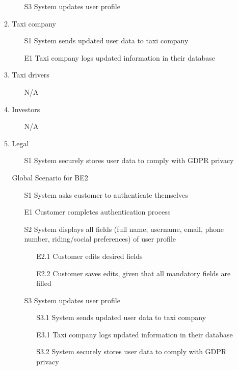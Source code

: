 \documentclass[]{article}
\begin{document}
\begin{enumerate}[{BE}1.]
\begin{enumerate}[{VP2}.1]
\begin{enumerate}
				\item[S3] System updates user profile
			\end{enumerate}
		\item Taxi company
			\begin{enumerate}
				\item[S1] System sends updated user data to taxi company
				\item[E1] Taxi company logs updated information in their database
			\end{enumerate}
		\item Taxi drivers
			\begin{enumerate}
				\item[N/A]
			\end{enumerate}
		\item Investors
			\begin{enumerate}
				\item[N/A]
			\end{enumerate}
		\item Legal
			\begin{enumerate}
				\item[S1] System securely stores user data to comply with GDPR privacy
			\end{enumerate}
		\item[Global] Scenario for BE2
			\begin{enumerate}
				\item[S1] System asks customer to authenticate themselves
           			\item[E1] Customer completes authentication process
				\item[S2] System displays all fields (full name, username, email, phone number, riding/social preferences) of user profile
				\begin{enumerate}
					\item[E2.1] Customer edits desired fields
					\item[E2.2] Customer saves edits, given that all mandatory fields are filled
				\end{enumerate}
				\item[S3] System updates user profile
				\begin{enumerate}
					\item[S3.1] System sends updated user data to taxi company
					\item[E3.1] Taxi company logs updated information in their database
					\item[S3.2] System securely stores user data to comply with GDPR privacy

\end{enumerate}
\end{enumerate}
\end{enumerate}
\end{enumerate}
\end{document}
